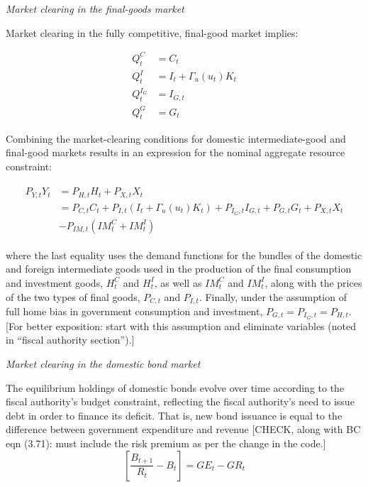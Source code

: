 \documentclass[a4paper,11pt]{article}
\numberwithin{equation}{section}
\begin{document}
	\vspace{8pt}
	\textit{Market clearing in the final-goods market}
	\vspace{8pt}
	
	Market clearing in the fully competitive, final-good market implies:
	
	\begin{align}
	Q_t^C&=C_t \label{market_c}\\
	Q_t^I&=I_t+\Gamma_u(u_t)K_t \label{market_i}\\
	Q_t^{I_G}&=I_{G,t} \label{market_ig}\\
	Q_t^G&=G_t \label{market_g}
	\end{align}
	
	Combining the market-clearing conditions for domestic intermediate-good and final-good markets results in an expression for the nominal aggregate resource constraint:
	
	\begin{align} \label{agg_y_nom}
	\begin{split}
	P_{Y,t}Y_t &= P_{H,t}H_t+P_{X,t}X_t\\
	           &= P_{C,t}C_t+P_{I,t}\left(I_t+\Gamma_u(u_t)K_t\right)+P_{I_G,t}I_{G,t}+P_{G,t}G_t+P_{X,t}X_t \\
	           &-P_{IM,t}\left(IM_t^C+IM_t^I\right)
	\end{split}
	\end{align}
	
	where the last equality uses the demand functions for the bundles of the domestic and foreign intermediate goods used in the production of the final consumption and investment goods, $H_t^C$ and $H_t^I$, as well as $IM_t^C$ and $IM_t^I$, along with the prices of the two types of final goods, $P_{C,t}$ and $P_{I,t}$. {\color{red}Finally, under the assumption of full home bias in government consumption and investment,  $P_{G,t}=P_{I_G,t}=P_{H,t}$. [For better exposition: start with this assumption and eliminate variables (noted in ``fiscal authority section'').]}
	
	\vspace{8pt}
	\textit{Market clearing in the domestic bond market}
	\vspace{8pt}
	
	The equilibrium holdings of domestic bonds evolve over time according to the fiscal authority's budget constraint, reflecting the fiscal authority's need to issue debt in order to finance its deficit. That is, new bond issuance is equal to the difference between government expenditure and revenue {\color{red}[CHECK, along with BC eqn (3.71): must include the risk premium as per the change in the code.]}
	{\color{red}
	\begin{equation}
	\left[\frac{B_{t+1}}{R_t}-B_t\right]=GE_t-GR_t
	\end{equation}
	}
	
\end{document}
